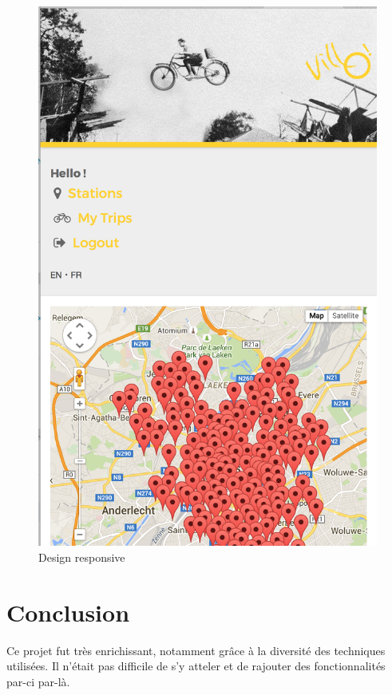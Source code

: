 \documentclass[a4paper]{article}
\begin{document}
    \begin{figure}
    \begin{center}
    \includegraphics[width=\textwidth/2]{images/s23.png}
    \end{center}
    \caption{Design responsive}
    \label{fig-s23}
    \end{figure}
   
\section{Conclusion}

Ce projet fut très enrichissant, notamment grâce à la diversité des techniques utilisées. Il n'était pas difficile de s'y atteler et de rajouter des fonctionnalités par-ci par-là.\\
\end{document}
